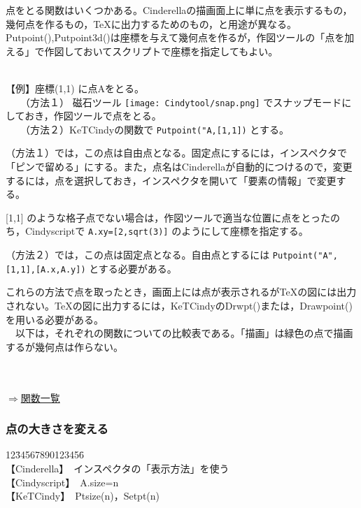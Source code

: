 \documentclass[papersize,a4paper,12pt,uplatex]{jsarticle}
\begin{document}
点をとる関数はいくつかある。Cinderellaの描画面上に単に点を表示するもの，幾何点を作るもの，TeXに出力するためのもの，と用途が異なる。
Putpoint(),Putpoint3d()は座標を与えて幾何点を作るが，作図ツールの「点を加える」で作図しておいてスクリプトで座標を指定してもよい。

　\\
【例】座標(1,1) に点Aをとる。\\
　　（方法１） 磁石ツール \texttt{[image: Cindytool/snap.png]} でスナップモードにしておき，作図ツールで点をとる。\\
　　（方法２）KeTCindyの関数で \verb|Putpoint("A,[1,1])| とする。

（方法１）では，この点は自由点となる。固定点にするには，インスペクタで「ピンで留める」にする。また，点名はCinderellaが自動的につけるので，変更するには，点を選択しておき，インスペクタを開いて「要素の情報」で変更する。

[1,1] のような格子点でない場合は，作図ツールで適当な位置に点をとったのち，Cindyscriptで \verb|A.xy=[2,sqrt(3)]| のようにして座標を指定する。

（方法２）では，この点は固定点となる。自由点とするには \verb|Putpoint("A",[1,1],[A.x,A.y])| とする必要がある。

これらの方法で点を取ったとき，画面上には点が表示されるがTeXの図には出力されない。TeXの図に出力するには，KeTCindyのDrwpt()または，Drawpoint()を用いる必要がある。\\

　以下は，それぞれの関数についての比較表である。「描画」は緑色の点で描画するが幾何点は作らない。\\
　\\
　　　　　
\begin{flushright} \hyperlink{functionlist3d}{$\Rightarrow$関数一覧}\end{flushright}

\subsubsection{点の大きさを変える}

\begin{tabbing}
12\=34567890123456\=\kill\\

\>【Cinderella】　\>インスペクタの「表示方法」を使う\\ 
\>【Cindyscript】　\>A.size=n\\
 \>【KeTCindy】　\>Ptsize(n)，Setpt(n)\\
\end{tabbing}
\end{document}
